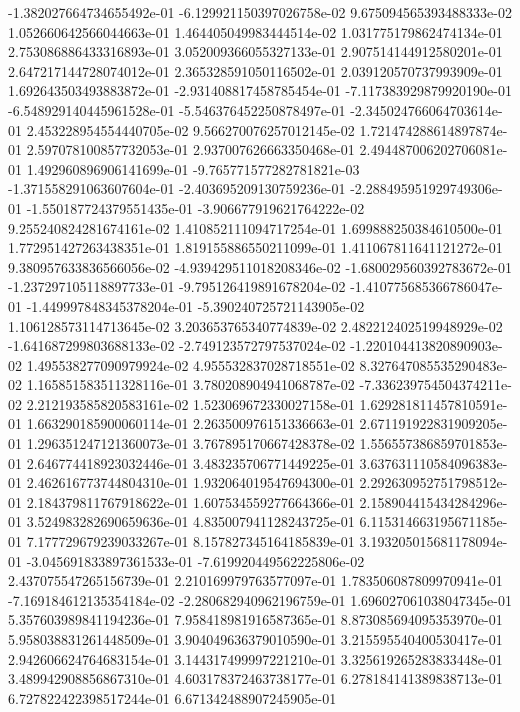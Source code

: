 -1.382027664734655492e-01
-6.129921150397026758e-02
9.675094565393488333e-02
1.052660642566044663e-01
1.464405049983444514e-02
1.031775179862474134e-01
2.753086886433316893e-01
3.052009366055327133e-01
2.907514144912580201e-01
2.647217144728074012e-01
2.365328591050116502e-01
2.039120570737993909e-01
1.692643503493883872e-01
-2.931408817458785454e-01
-7.117383929879920190e-01
-6.548929140445961528e-01
-5.546376452250878497e-01
-2.345024766064703614e-01
2.453228954554440705e-02
9.566270076257012145e-02
1.721474288614897874e-01
2.597078100857732053e-01
2.937007626663350468e-01
2.494487006202706081e-01
1.492960896906141699e-01
-9.765771577282781821e-03
-1.371558291063607604e-01
-2.403695209130759236e-01
-2.288495951929749306e-01
-1.550187724379551435e-01
-3.906677919621764222e-02
9.255240824281674161e-02
1.410852111094717254e-01
1.699888250384610500e-01
1.772951427263438351e-01
1.819155886550211099e-01
1.411067811641121272e-01
9.380957633836566056e-02
-4.939429511018208346e-02
-1.680029560392783672e-01
-1.237297105118897733e-01
-9.795126419891678204e-02
-1.410775685366786047e-01
-1.449997848345378204e-01
-5.390240725721143905e-02
1.106128573114713645e-02
3.203653765340774839e-02
2.482212402519948929e-02
-1.641687299803688133e-02
-2.749123572797537024e-02
-1.220104413820890903e-02
1.495538277090979924e-02
4.955532837028718551e-02
8.327647085535290483e-02
1.165851583511328116e-01
3.780208904941068787e-02
-7.336239754504374211e-02
2.212193585820583161e-02
1.523069672330027158e-01
1.629281811457810591e-01
1.663290185900060114e-01
2.263500976151336663e-01
2.671191922831909205e-01
1.296351247121360073e-01
3.767895170667428378e-02
1.556557386859701853e-01
2.646774418923032446e-01
3.483235706771449225e-01
3.637631110584096383e-01
2.462616773744804310e-01
1.932064019547694300e-01
2.292630952751798512e-01
2.184379811767918622e-01
1.607534559277664366e-01
2.158904415434284296e-01
3.524983282690659636e-01
4.835007941128243725e-01
6.115314663195671185e-01
7.177729679239033267e-01
8.157827345164185839e-01
3.193205015681178094e-01
-3.045691833897361533e-01
-7.619920449562225806e-02
2.437075547265156739e-01
2.210169979763577097e-01
1.783506087809970941e-01
-7.169184612135354184e-02
-2.280682940962196759e-01
1.696027061038047345e-01
5.357603989841194236e-01
7.958418981916587365e-01
8.873085694095353970e-01
5.958038831261448509e-01
3.904049636379010590e-01
3.215595540400530417e-01
2.942606624764683154e-01
3.144317499997221210e-01
3.325619265283833448e-01
3.489942908856867310e-01
4.603178372463738177e-01
6.278184141389838713e-01
6.727822422398517244e-01
6.671342488907245905e-01
